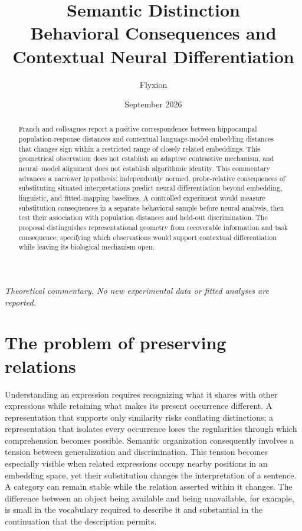 \documentclass[11pt]{article}
\title{Semantic Distinction\\\large Behavioral Consequences and Contextual Neural Differentiation}
\author{Flyxion}\date{September 2026}
\begin{document}
\maketitle
\begin{abstract}
Franch and colleagues report a positive correspondence between
hippocampal population-response distances and contextual language-model
embedding distances that changes sign within a restricted range of
closely related embeddings. This geometrical observation does not
establish an adaptive contrastive mechanism, and neural--model alignment
does not establish algorithmic identity. This commentary advances a
narrower hypothesis: independently normed, probe-relative consequences
of substituting situated interpretations predict neural differentiation
beyond embedding, linguistic, and fitted-mapping baselines. A controlled
experiment would measure substitution consequences in a separate
behavioral sample before neural analysis, then test their association
with population distances and held-out discrimination. The proposal
distinguishes representational geometry from recoverable information and
task consequence, specifying which observations would support contextual
differentiation while leaving its biological mechanism open.

\end{abstract}
\noindent\textit{Theoretical commentary. No new experimental data or fitted analyses are reported.}

\hypertarget{the-problem-of-preserving-relations}{%
\section{The problem of preserving
relations}\label{the-problem-of-preserving-relations}}

Understanding an expression requires recognizing what it shares with
other expressions while retaining what makes its present occurrence
different. A representation that supports only similarity risks
conflating distinctions; a representation that isolates every occurrence
loses the regularities through which comprehension becomes possible.
Semantic organization consequently involves a tension between
generalization and discrimination. This tension becomes especially
visible when related expressions occupy nearby positions in an embedding
space, yet their substitution changes the interpretation of a sentence.
A category can remain stable while the relation asserted within it
changes. The difference between an object being available and being
unavailable, for example, is small in the vocabulary required to
describe it and substantial in the continuation that the description
permits.
\end{document}

